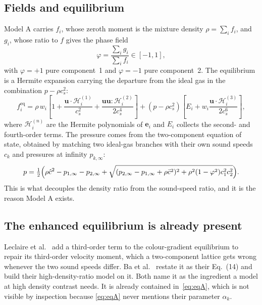\documentclass[11pt,a4paper]{article}
\theoremstyle{plain}
\theoremstyle{definition}
\newcommand{\ee}{\mathbf{e}}
\newcommand{\uu}{\mathbf{u}}
\newcommand{\cs}{c_s}
\begin{document}
\subsection{Fields and equilibrium}

Model A carries $f_i$, whose zeroth moment is the mixture density
$\rho = \sum_i f_i$, and $g_i$, whose ratio to $f$ gives the phase field
\begin{equation}
  \varphi = \frac{\sum_i g_i}{\sum_i f_i} \in [-1, 1],
\end{equation}
with $\varphi = +1$ pure component~1 and $\varphi = -1$ pure component~2. The
equilibrium is a Hermite expansion carrying the departure from the ideal gas in
the combination $p - \rho \cs^2$:
\begin{equation}
  f_i^{\mathrm{eq}} = \rho\, w_i \left[ 1 + \frac{\uu\cdot\mathcal{H}^{(1)}_i}{\cs^2}
    + \frac{\uu\uu : \mathcal{H}^{(2)}_i}{2\cs^4} \right]
    + (p - \rho \cs^2)\left[ E_i + w_i \frac{\uu \cdot \mathcal{H}^{(3)}_i}{2\cs^6} \right],
  \label{eq:eqA}
\end{equation}
where $\mathcal{H}^{(n)}_i$ are the Hermite polynomials of $\ee_i$ and $E_i$
collects the second- and fourth-order terms. The pressure comes from the
two-component equation of state, obtained by matching two ideal-gas branches
with their own sound speeds $c_k$ and pressures at infinity $p_{k,\infty}$:
\begin{equation}
  p = \tfrac12\Bigl( \rho \hat{c}^2 - p_{1,\infty} - p_{2,\infty}
    + \sqrt{(p_{2,\infty} - p_{1,\infty} + \rho \bar{c}^2)^2
            + \rho^2 (1-\varphi^2) c_1^2 c_2^2} \Bigr).
  \label{eq:eos}
\end{equation}
This is what decouples the density ratio from the sound-speed ratio, and it is
the reason Model A exists.

\subsection{The enhanced equilibrium is already present}

Leclaire et al.~\cite{leclaire2013} add a third-order term to the
colour-gradient equilibrium to repair its third-order velocity moment, which a
two-component lattice gets wrong whenever the two sound speeds differ. Ba et
al.~\cite{ba2016} restate it as their Eq.~(14) and build their high-density-ratio
model on it. Both name it as the ingredient a model at high density contrast
needs. It is already contained in~\eqref{eq:eqA}, which is not visible by
inspection because \eqref{eq:eqA} never mentions their parameter $\alpha_k$.
\end{document}
